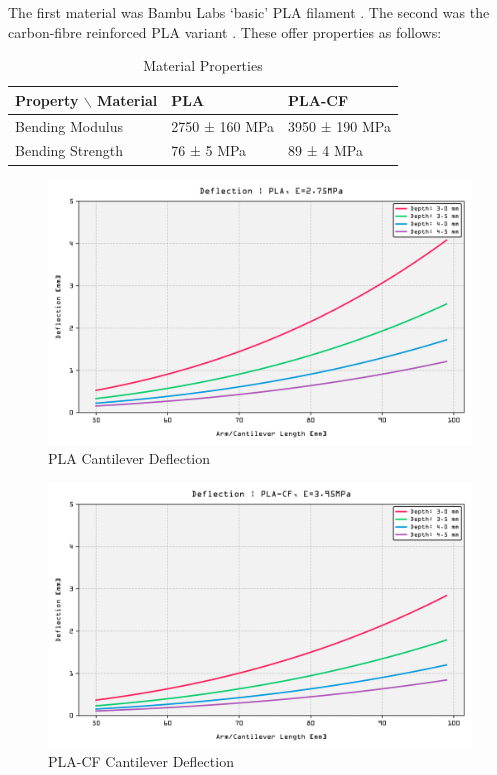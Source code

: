 \documentclass[10pt]{article}
\begin{document}
The first material was Bambu Labs `basic' PLA filament \cite{bambulab_pla2025}. The second was the
carbon-fibre reinforced PLA variant \cite{bambulab_placf2025}. These offer properties as follows: %

\begin{table}[H]
	\centering
	\caption{Material Properties \cite{bambulab_pla2025, bambulab_placf2025}} %
	\label{tab:material-properties}
	\begin{tabular}{@{}lll@{}}
		\toprule
		\textbf{Property $\backslash$ Material} & \textbf{PLA}   & \textbf{PLA-CF} \\
		\midrule
		Bending Modulus                         & 2750 ± 160 MPa & 3950 ± 190 MPa  \\
		Bending Strength                        & 76 ± 5 MPa     & 89 ± 4 MPa      \\
		\bottomrule
	\end{tabular}
\end{table}

\begin{figure}[H]
	\centering
	\includegraphics[width=\textwidth]{./assets/08-beam-deflection.png}
	\caption{PLA Cantilever Deflection}
	\label{fig:pla-deflection}
\end{figure}

\begin{figure}[H]
	\centering
	\includegraphics[width=\textwidth]{./assets/09-beam-deflection-cf.png}
	\caption{PLA-CF Cantilever Deflection}
	\label{fig:pla-cf-deflection}
\end{figure}
\end{document}
